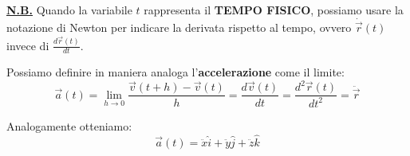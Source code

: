 \textbf{\underline{N.B.}} Quando la variabile $t$ rappresenta il \textbf{TEMPO FISICO}, possiamo usare la notazione di Newton per indicare la derivata rispetto al tempo, ovvero $\dot{\vec r}(t)$ invece di $\frac{d \vec r(t)}{dt}$.

\begin{definition}
    Possiamo definire in maniera analoga l'\textbf{accelerazione} come il limite:
    \begin{equation*}
        \vec a(t) = \lim_{h \to 0} \frac{\vec v(t+h) - \vec v(t)}{h} = \frac{d \vec v(t)}{dt} = \frac{d^2 \vec r(t)}{dt^2}= \ddot{\vec r}
    \end{equation*}

    Analogamente otteniamo:
    \begin{equation*}
        \vec a(t) = \ddot{x}\hat i + \ddot{y}\hat j + \ddot{z}\hat k
    \end{equation*}
\end{definition}

